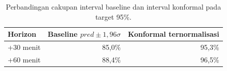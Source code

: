 \begin{table}[!htbp]
    \centering
    \caption{Perbandingan cakupan interval baseline dan interval konformal pada target 95\%.}
    \label{tab:tab6.7_perbandingan_interval_baseline_dan_konformal}
    \begin{tabular}{lrr}
        \hline
        \textbf{Horizon} & \textbf{Baseline $pred \pm 1,96\sigma$} & \textbf{Konformal ternormalisasi} \\
        \hline
        +30 menit & 85,0\% & 95,3\% \\
        +60 menit & 88,4\% & 96,5\% \\
        \hline
    \end{tabular}
\end{table}